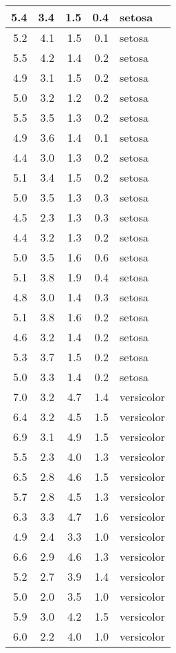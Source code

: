 \begin{tabular}{r|r|r|r|l}
\hline
5.4 & 3.4 & 1.5 & 0.4 & setosa\\
\hline
5.2 & 4.1 & 1.5 & 0.1 & setosa\\
\hline
5.5 & 4.2 & 1.4 & 0.2 & setosa\\
\hline
4.9 & 3.1 & 1.5 & 0.2 & setosa\\
\hline
5.0 & 3.2 & 1.2 & 0.2 & setosa\\
\hline
5.5 & 3.5 & 1.3 & 0.2 & setosa\\
\hline
4.9 & 3.6 & 1.4 & 0.1 & setosa\\
\hline
4.4 & 3.0 & 1.3 & 0.2 & setosa\\
\hline
5.1 & 3.4 & 1.5 & 0.2 & setosa\\
\hline
5.0 & 3.5 & 1.3 & 0.3 & setosa\\
\hline
4.5 & 2.3 & 1.3 & 0.3 & setosa\\
\hline
4.4 & 3.2 & 1.3 & 0.2 & setosa\\
\hline
5.0 & 3.5 & 1.6 & 0.6 & setosa\\
\hline
5.1 & 3.8 & 1.9 & 0.4 & setosa\\
\hline
4.8 & 3.0 & 1.4 & 0.3 & setosa\\
\hline
5.1 & 3.8 & 1.6 & 0.2 & setosa\\
\hline
4.6 & 3.2 & 1.4 & 0.2 & setosa\\
\hline
5.3 & 3.7 & 1.5 & 0.2 & setosa\\
\hline
5.0 & 3.3 & 1.4 & 0.2 & setosa\\
\hline
7.0 & 3.2 & 4.7 & 1.4 & versicolor\\
\hline
6.4 & 3.2 & 4.5 & 1.5 & versicolor\\
\hline
6.9 & 3.1 & 4.9 & 1.5 & versicolor\\
\hline
5.5 & 2.3 & 4.0 & 1.3 & versicolor\\
\hline
6.5 & 2.8 & 4.6 & 1.5 & versicolor\\
\hline
5.7 & 2.8 & 4.5 & 1.3 & versicolor\\
\hline
6.3 & 3.3 & 4.7 & 1.6 & versicolor\\
\hline
4.9 & 2.4 & 3.3 & 1.0 & versicolor\\
\hline
6.6 & 2.9 & 4.6 & 1.3 & versicolor\\
\hline
5.2 & 2.7 & 3.9 & 1.4 & versicolor\\
\hline
5.0 & 2.0 & 3.5 & 1.0 & versicolor\\
\hline
5.9 & 3.0 & 4.2 & 1.5 & versicolor\\
\hline
6.0 & 2.2 & 4.0 & 1.0 & versicolor\\

\end{tabular}
